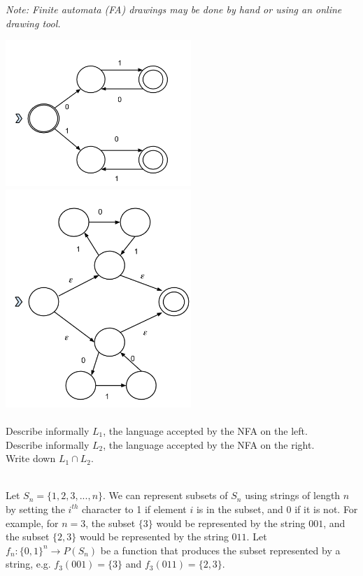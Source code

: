\documentclass[solution, letterpaper]{cs121}
\begin{document}
\textit{Note: Finite automata (FA) drawings may be done by hand or using an online drawing tool.}

\includegraphics[width=7.0cm]{1-2a.png} \includegraphics[width=7.0cm]{1-2b.png}\\\\
\subproblem Describe informally $L_1$, the language accepted by the NFA on the left.\\
\subproblem Describe informally $L_2$, the language accepted by the NFA on the right.\\
\subproblem Write down $L_1 \cap L_2$.
\\\\

\pagebreak

Let $S_n = \{1, 2, 3, ..., n\}$. We can represent subsets of $S_n$ using strings of length $n$ by setting the $i^{th}$ character to 1 if element $i$ is in the subset, and 0 if it is not. For example, for $n = 3$, the subset $\{3\}$ would be represented by the string $001$, and the subset $\{2, 3\}$ would be represented by the string $011$. Let $f_n : \{0, 1\}^n \to P(S_n) $ be a function that produces the subset represented by a string, e.g. $f_3(001) = \{3\}$ and $f_3(011) = \{2, 3\}$.
\end{document}

